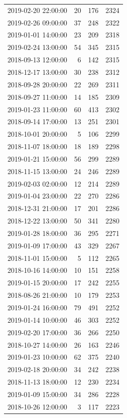 \begin{tabular}{lrrr}
2019-02-20 22:00:00 & 20 & 176 & 2324 \\
2019-02-26 09:00:00 & 37 & 248 & 2322 \\
2019-01-01 14:00:00 & 23 & 209 & 2318 \\
2019-02-24 13:00:00 & 54 & 345 & 2315 \\
2018-09-13 12:00:00 & 6 & 142 & 2315 \\
2018-12-17 13:00:00 & 30 & 238 & 2312 \\
2018-09-28 20:00:00 & 22 & 269 & 2311 \\
2018-09-27 11:00:00 & 14 & 185 & 2309 \\
2019-01-23 11:00:00 & 60 & 413 & 2302 \\
2018-09-14 17:00:00 & 13 & 251 & 2301 \\
2018-10-01 20:00:00 & 5 & 106 & 2299 \\
2018-11-07 18:00:00 & 18 & 189 & 2298 \\
2019-01-21 15:00:00 & 56 & 299 & 2289 \\
2018-11-15 13:00:00 & 24 & 246 & 2289 \\
2019-02-03 02:00:00 & 12 & 214 & 2289 \\
2019-01-04 23:00:00 & 22 & 270 & 2286 \\
2018-12-31 21:00:00 & 17 & 201 & 2286 \\
2018-12-22 13:00:00 & 50 & 341 & 2280 \\
2019-01-28 18:00:00 & 36 & 295 & 2271 \\
2019-01-09 17:00:00 & 43 & 329 & 2267 \\
2018-11-01 15:00:00 & 5 & 112 & 2265 \\
2018-10-16 14:00:00 & 10 & 151 & 2258 \\
2019-01-15 20:00:00 & 17 & 242 & 2255 \\
2018-08-26 21:00:00 & 10 & 179 & 2253 \\
2019-01-24 16:00:00 & 79 & 491 & 2252 \\
2019-01-14 10:00:00 & 46 & 303 & 2252 \\
2019-02-20 17:00:00 & 36 & 266 & 2250 \\
2018-10-27 14:00:00 & 26 & 163 & 2246 \\
2019-01-23 10:00:00 & 62 & 375 & 2240 \\
2019-02-18 20:00:00 & 34 & 242 & 2238 \\
2018-11-13 18:00:00 & 12 & 230 & 2234 \\
2019-01-09 15:00:00 & 34 & 286 & 2228 \\
2018-10-26 12:00:00 & 3 & 117 & 2223 \\

\end{tabular}
